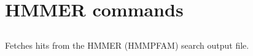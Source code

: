 

\section{HMMER commands}


\subsection[hmm\_score\_extract]{  }



Fetches hits from the HMMER (HMMPFAM) search output file.


